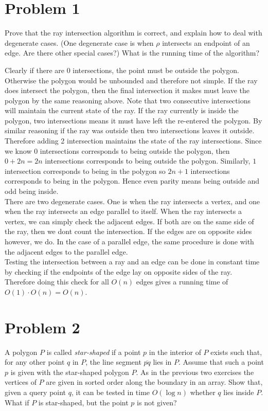 \documentclass[12pt]{extarticle}
\begin{document}
\section*{Problem 1}
Prove that the ray intersection algorithm is correct, and explain how to deal with degenerate cases. (One degenerate case is when $\rho$ intersects an endpoint of an edge. Are there other special cases?) What is the running time of the algorithm? 

\begin{solution}
    Clearly if there are $0$ intersections, the point must be outside the polygon. Otherwise the polygon would be unbounded and therefore not simple. If the ray does intersect the polygon, then the final intersection it makes must leave the polygon by the same reasoning above. Note that two consecutive intersections will maintain the current state of the ray. If the ray currently is inside the polygon, two intersections means it must have left the re-entered the polygon. By similar reasoning if the ray was outside then two intersections leaves it outside. Therefore adding 2 intersection maintains the state of the ray intersections. Since we know $0$ intersections corresponds to being outside the polygon, then $0 + 2n = 2n$ intersections corresponds to being outside the polygon. Similarly, $1$ intersection corresponds to being in the polygon so $2n + 1$ intersections corresponds to being in the polygon. Hence even parity means being outside and odd being inside.
    \\

    There are two degenerate cases. One is when the ray intersects a vertex, and one when the ray intersects an edge parallel to itself. When the ray intersects a vertex, we can simply check the adjacent edges. If both are on the same side of the ray, then we dont count the intersection. If the edges are on opposite sides however, we do. In the case of a parallel edge, the same procedure is done with the adjacent edges to the parallel edge.
    \\

    Testing the intersection between a ray and an edge can be done in constant time by checking if the endpoints of the edge lay on opposite sides of the ray. Therefore doing this check for all $O(n)$ edges gives a running time of $O(1) \cdot O(n) = O(n)$.
\end{solution} 

\section*{Problem 2}
A polygon $P$ is called \textit{star-shaped} if a point $p$ in the interior of $P$ exists such that, for any other point $q$ in $P$, the line segment $\overline{pq}$ lies in $P$. Assume that such a point $p$ is given with the star-shaped polygon $P$. As in the previous two exercises the vertices of $P$ are given in sorted order along the boundary in an array. Show that, given a query point $q$, it can be tested in time $O(\log n)$ whether $q$ lies inside $P$. What if $P$ is star-shaped, but the point $p$ is not given?
\end{document}
